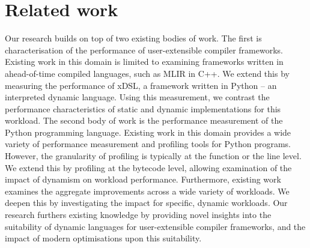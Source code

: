 \chapter{Related work}
\label{chap:related-work}

%
%

Our research builds on top of two existing bodies of work.
The first is characterisation of the performance of user-extensible compiler frameworks. Existing work in this domain is limited to examining frameworks written in ahead-of-time compiled languages, such as MLIR in C++.
We extend this by measuring the performance of xDSL, a framework written in Python -- an interpreted dynamic language. Using this measurement, we contrast the performance characteristics of static and dynamic implementations for this workload.
The second body of work is the performance measurement of the Python programming language. Existing work in this domain provides a wide variety of performance measurement and profiling tools for Python programs. However, the granularity of profiling is typically at the function or the line level.
We extend this by profiling at the bytecode level, allowing examination of the impact of dynamism on workload performance.
Furthermore, existing work examines the aggregate improvements across a wide variety of workloads.
We deepen this by investigating the impact for specific, dynamic workloads.
Our research furthers existing knowledge by providing novel insights into the suitability of dynamic languages for user-extensible compiler frameworks, and the impact of modern optimisations upon this suitability.





